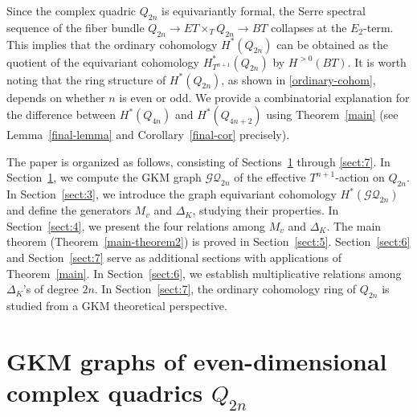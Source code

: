 \documentclass[12pt]{amsart}
\theoremstyle{remark}
\numberwithin{equation}{section}
\begin{document}
Since the complex quadric $Q_{2n}$ is equivariantly formal, the Serre spectral sequence of the fiber bundle $Q_{2n}\to ET\times_{T}Q_{2n}\to BT$ collapses at the $E_{2}$-term.
This implies that 
the ordinary cohomology $H^{*}(Q_{2n})$ can be obtained as the quotient of the equivariant cohomology $H_{T^{n+1}}^{*}(Q_{2n})$ by $H^{>0}(BT)$.
It is worth noting that the ring structure of $H^{*}(Q_{2n})$, as shown in \eqref{ordinary-cohom}, depends on whether $n$ is even or odd.
We provide a combinatorial explanation for the difference between $H^{*}(Q_{4n})$ and $H^{*}(Q_{4n+2})$ using Theorem~\ref{main} (see Lemma~\ref{final-lemma} and  Corollary~\ref{final-cor} precisely). 

The paper is organized as follows, consisting of Sections~\ref{sect:2} through \ref{sect:7}.
In Section~\ref{sect:2}, 
we compute the GKM graph $\mathcal{GQ}_{2n}$ of the effective $T^{n+1}$-action on $Q_{2n}$.
In Section~\ref{sect:3}, 
we introduce the graph equivariant cohomology $H^{*}(\mathcal{GQ}_{2n})$ 
and define the generators $M_{v}$ and $\Delta_{K}$, studying their properties.
In Section~\ref{sect:4}, we present the four relations among $M_{v}$ and $\Delta_{K}$.
The main theorem (Theorem~\ref{main-theorem2}) is proved in Section~\ref{sect:5}.
Section~\ref{sect:6} and Section~\ref{sect:7} serve as additional sections with applications of Theorem~\ref{main}.
In Section~\ref{sect:6}, we establish multiplicative relations among $\Delta_{K}$'s of degree $2n$.
In Section~\ref{sect:7}, the ordinary cohomology ring of $Q_{2n}$ is studied from a GKM theoretical perspective.

\section{GKM graphs of even-dimensional complex quadrics $Q_{2n}$}
\label{sect:2}
\end{document}
